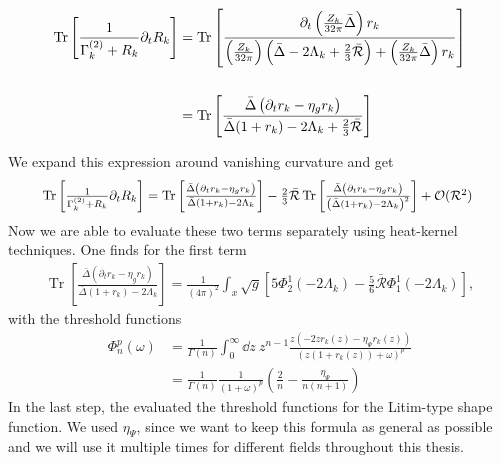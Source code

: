 \begin{align}
\operatorname{Tr}\left[\frac{1}{\Gamma_{k}^{(2)} + R_k}\partial_t R_k\right] & = \operatorname{Tr}\left[\frac{\partial_t\left(\frac{Z_k}{32\pi}\bar{\Delta}\right)r_k}{\left(\frac{Z_k}{32\pi}\right)\left(\bar{\Delta} - 2\Lambda_k + \frac{2}{3}\bar{\mathcal{R}}\right) + \left(\frac{Z_k}{32\pi}\bar{\Delta}\right) r_k}\right]	\nonumber \\
\phantom{.} \\
&= \operatorname{Tr}\left[\frac{\bar{\Delta}\left(\partial_t r_k - \eta_g r_k\right)}{\bar{\Delta}(1+r_k)-2\Lambda_k+\frac{2}{3}\bar{\mathcal{R}}}\right] \nonumber
\end{align}

We expand this expression around vanishing curvature and get
\begin{align}
\resizebox{.9 \textwidth}{!}{$
\operatorname{Tr}\left[\frac{1}{\Gammak^{(2)} + R_k}\partial_t R_k\right] = \operatorname{Tr}\left[\frac{\bar{\Delta}\left(\partial_t r_k - \eta_g r_k\right)}{\bar{\Delta}(1+r_k)-2\Lambda_k}\right] - \frac{2}{3}\bar{\mathcal{R}}\operatorname{Tr}\left[\frac{\bar{\Delta}\left(\partial_t r_k - \eta_g r_k\right)}{\left(\bar{\Delta}(1+r_k)-2\Lambda_k\right)^2}\right] + \mathcal{O}(\mathcal{R}^2)$
}
\end{align}
Now we are able to evaluate these two terms separately using heat-kernel techniques. One finds for the first term
\begin{align}
\operatorname{Tr}\left[\frac{\bar{\Delta}\left(\partial_t r_k - \eta_g r_k\right)}{\bar{\Delta}(1+r_k)-2\Lambda_k}\right] = \frac{1}{(4\pi)^2}\int_x \sqrt{g} \left[5\Phi_2^1(-2\Lambda_k) - \frac{5}{6}\bar{\mathcal{R}}\Phi^1_1(-2\Lambda_k)\right],
\end{align}
with the threshold functions 
\begin{equation}
\begin{aligned}
	\Phi_n^p(\omega) &= \frac{1}{\Gamma(n)}\int_0^{\infty}\dd z \ z^{n-1} \frac{z(-2zr_k(z)-\eta_{\Psi}r_k(z))}{(z(1+r_k(z))+\omega)^p}\\[10pt] 
	&= \frac{1}{\Gamma(n)}\frac{1}{\left(1+\omega\right)^p}\left(\frac{2}{n} - \frac{\eta_{\Psi}}{n(n+1)}\right)
\end{aligned}
\label{eqn:threshold}
\end{equation}
In the last step, the evaluated the threshold functions for the Litim-type shape function. We used $\eta_\Psi$, since we want to keep this formula as general as possible and we will use it multiple times for different fields throughout this thesis.\\
